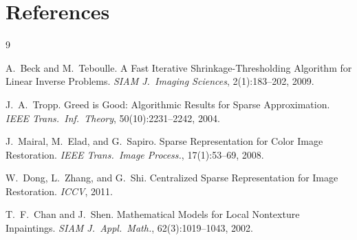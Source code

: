 \documentclass[11pt,a4paper]{article}
\begin{document}
\section*{References}

\renewcommand{\refname}{}
\vspace{-2em}

\begin{thebibliography}{9}

A.~Beck and M.~Teboulle.
\newblock A Fast Iterative Shrinkage-Thresholding Algorithm for Linear
Inverse Problems.
\newblock \emph{SIAM J.\ Imaging Sciences}, 2(1):183--202, 2009.

J.~A.~Tropp.
\newblock Greed is Good: Algorithmic Results for Sparse Approximation.
\newblock \emph{IEEE Trans.\ Inf.\ Theory}, 50(10):2231--2242, 2004.

J.~Mairal, M.~Elad, and G.~Sapiro.
\newblock Sparse Representation for Color Image Restoration.
\newblock \emph{IEEE Trans.\ Image Process.}, 17(1):53--69, 2008.

W.~Dong, L.~Zhang, and G.~Shi.
\newblock Centralized Sparse Representation for Image Restoration.
\newblock \emph{ICCV}, 2011.

T.~F.~Chan and J.~Shen.
\newblock Mathematical Models for Local Nontexture Inpaintings.
\newblock \emph{SIAM J.\ Appl.\ Math.}, 62(3):1019--1043, 2002.

\end{thebibliography}
\end{document}
